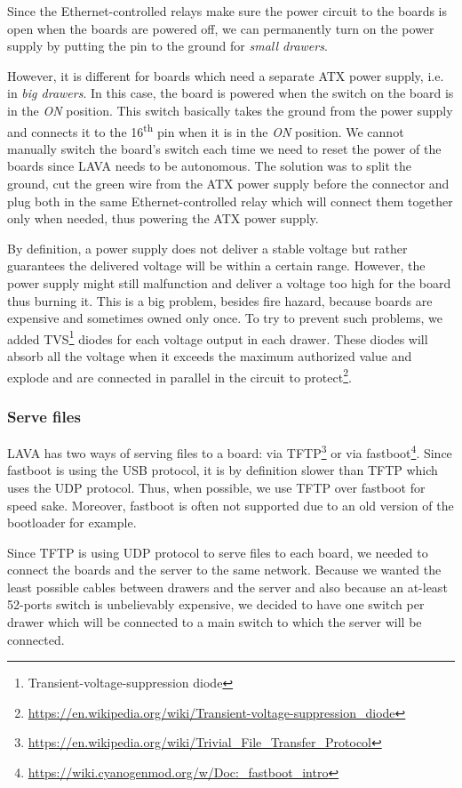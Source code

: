 Since the Ethernet-controlled relays make sure the power circuit to the boards is open when the boards are powered off, we can permanently turn on the power supply by putting the pin to the ground for \textit{small drawers}.

However, it is different for boards which need a separate ATX power supply, i.e. in \textit{big drawers}. In this case, the board is powered when the switch on the board is in the \textit{ON} position. This switch basically takes the ground from the power supply and connects it to the 16\textsuperscript{th} pin when it is in the \textit{ON} position. We cannot manually switch the board's switch each time we need to reset the power of the boards since LAVA needs to be autonomous. The solution was to split the ground, cut the green wire from the ATX power supply before the connector and plug both in the same Ethernet-controlled relay which will connect them together only when needed, thus powering the ATX power supply.

By definition, a power supply does not deliver a stable voltage but rather guarantees the delivered voltage will be within a certain range. However, the power supply might still malfunction and deliver a voltage too high for the board thus burning it. This is a big problem, besides fire hazard, because boards are expensive and sometimes owned only once. To try to prevent such problems, we added TVS\footnote{Transient-voltage-suppression diode} diodes for each voltage output in each drawer. These diodes will absorb all the voltage when it exceeds the maximum authorized value and explode and are connected in parallel in the circuit to protect\footnote{\url{https://en.wikipedia.org/wiki/Transient-voltage-suppression\_diode}}.

\subsubsection{Serve files}

LAVA has two ways of serving files to a board: via TFTP\footnote{\url{https://en.wikipedia.org/wiki/Trivial\_File\_Transfer\_Protocol}} or via fastboot\footnote{\url{https://wiki.cyanogenmod.org/w/Doc:\_fastboot\_intro}}. Since fastboot is using the USB protocol, it is by definition slower than TFTP which uses the UDP protocol. Thus, when possible, we use TFTP over fastboot for speed sake. Moreover, fastboot is often not supported due to an old version of the bootloader for example.

Since TFTP is using UDP protocol to serve files to each board, we needed to connect the boards and the server to the same network. Because we wanted the least possible cables between drawers and the server and also because an at-least 52-ports switch is unbelievably expensive, we decided to have one switch per drawer which will be connected to a main switch to which the server will be connected.

